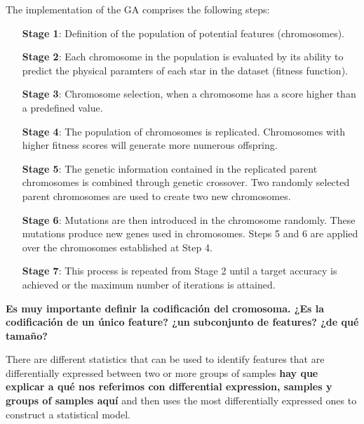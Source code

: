 The implementation of the GA comprises the following steps:

\begin{itemize}
\item [\textbf{Stage 1}:]{Definition of the population of potential features (chromosomes).}
\item [\textbf{Stage 2}:]{Each chromosome in the population is evaluated by its ability to
predict the physical paramters of each star in the dataset (fitness
function).}
\item [\textbf{Stage 3}:]{Chromosome selection, when a chromosome has 
 a score higher than a predefined value.}
\item [\textbf{Stage 4}:]{The population of chromosomes is replicated. 
 Chromosomes with higher fitness scores will generate more numerous
 offspring.}
\item [\textbf{Stage 5}:]{The genetic information contained in the replicated parent
chromosomes is combined through genetic crossover. Two randomly
selected parent chromosomes are used to create two new chromosomes.}
\item [\textbf{Stage 6}:]{Mutations are then introduced in the chromosome randomly. 
 These mutations produce new genes used in chromosomes.  Steps 5 and 6
 are applied over the chromosomes established at Step 4.}
\item [\textbf{Stage 7}:]{This process is repeated from Stage 2 until 
  a target accuracy is achieved or the maximum number of iterations is
  attained.}
\end{itemize}

{\bf Es muy importante definir la codificación del cromosoma. ¿Es la
codificación de un único feature? ¿un subconjunto de features? ¿de qué
tamaño?}

There are different statistics that can be used to identify features
that are differentially expressed between two or more groups of
samples {\bf hay que explicar a qué nos referimos con differential
expression, samples y groups of samples aquí} and then uses the most
differentially expressed ones to construct a statistical model.

